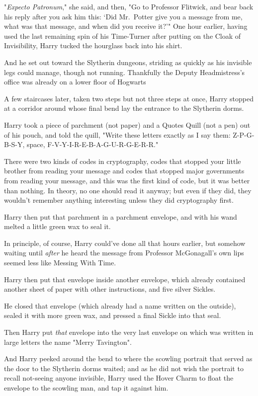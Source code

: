 "\emph{Expecto Patronum}," she said, and then, "Go to Professor Flitwick, and
bear back his reply after you ask him this: `Did Mr.~Potter give you a message
from me, what was that message, and when did you receive it?'"
\sbreak
One hour earlier, having used the last remaining spin of his Time-Turner after
putting on the Cloak of Invisibility, Harry tucked the hourglass back into his
shirt.

And he set out toward the Slytherin dungeons, striding as quickly as his
invisible legs could manage, though not running. Thankfully the Deputy
Headmistress's office was already on a lower floor of Hogwarts{\el}

A few staircases later, taken two steps but not three steps at once, Harry
stopped at a corridor around whose final bend lay the entrance to the Slytherin
dorms.

Harry took a piece of parchment (not paper) and a Quotes
Quill (not a pen) out of his pouch, and told the quill, "Write these letters
exactly as I say them: Z-P-G-B-S-Y, space, F-V-Y-I-R-E-B-A-G-U-R-G-E-R-R."

There were two kinds of codes in cryptography, codes that stopped your little
brother from reading your message and codes that stopped major governments from
reading your message, and this was the first kind of code, but it was better
than nothing. In theory, no one should read it anyway; but even if they did,
they wouldn't remember anything interesting unless they did cryptography first.

Harry then put that parchment in a parchment envelope, and with his wand melted
a little green wax to seal it.

In principle, of course, Harry could've done all that hours earlier, but
somehow waiting until \emph{after} he heard the message from Professor
McGonagall's own lips seemed less like Messing With Time.

Harry then put that envelope inside another envelope, which already contained
another sheet of paper with other instructions, and five silver Sickles.

He closed that envelope (which already had a name written on the outside),
sealed it with more green wax, and pressed a final Sickle into that seal.

Then Harry put \emph{that} envelope into the very last envelope on which was
written in large letters the name "Merry Tavington".

And Harry peeked around the bend to where the scowling portrait that served as
the door to the Slytherin dorms waited; and as he did not wish the portrait to
recall not-seeing anyone invisible, Harry used the Hover Charm to float the
envelope to the scowling man, and tap it against him.

